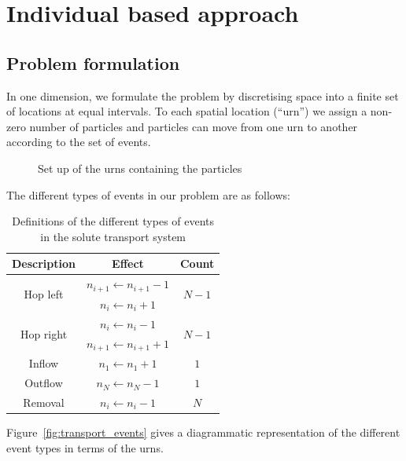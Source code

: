\chapter{Individual based approach}
\section{Problem formulation}
In one dimension, we formulate the problem by discretising space into a
finite set of locations at equal intervals. To each spatial location (``urn'') we assign
a non-zero number of particles and particles can move from one urn to
another according to the set of events.

\begin{figure}[ht!]
    \centering
    {
    }
    \caption{\label{fig:urns}Set up of the urns containing the particles}
\end{figure}

The different types of events in our problem are as follows:
\begin{table}[ht!]
    \centering
    \begin{tabular}{ c | c | c }
        Description & Effect & Count \\ \hline\hline
        \multirow{2}{*}{Hop left} & \(n_{i+1} \leftarrow n_{i+1} - 1\) & \multirow{2}{*}{\(N-1\)} \\ & \(n_i \leftarrow n_i + 1\) \\ \hline
        \multirow{2}{*}{Hop right} & \(n_i \leftarrow n_i - 1\) & \multirow{2}{*}{\(N-1\)} \\ & \(n_{i+1} \leftarrow n_{i+1} + 1\) \\ \hline
        Inflow & \(n_1 \leftarrow n_1 + 1\) & \(1\) \\ \hline
        Outflow & \(n_N \leftarrow n_N - 1\) & \(1\) \\ \hline
        Removal & \(n_i \leftarrow n_i - 1\) & \(N\) \\
    \end{tabular}
    \caption{\label{tab:generic_transport_events}Definitions of the different types of
events in the solute transport system}
\end{table}

Figure~\ref{fig:transport_events} gives a diagrammatic representation of the
different event types in terms of the urns.

